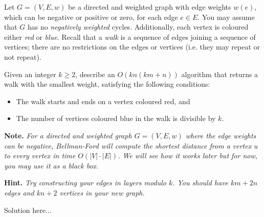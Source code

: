 \documentclass{article}
\begin{document}
\begin{question}
Let $G = (V, E, w)$ be a directed and weighted graph with edge weights $w(e)$, which can be negative or positive or zero, for each edge $e \in E$. You may assume that $G$ has no {\em negatively weighted} cycles. Additionally, each vertex is coloured either {\em red} or {\em blue}. Recall that a {\em walk} is a sequence of edges joining a sequence of vertices; there are no restrictions on the edges or vertices (i.e. they may repeat or not repeat).

Given an integer $k \geq 2$, describe an $O(kn(km + n))$ algorithm that returns a walk with the smallest weight, satisfying the following conditions:
\begin{itemize}
    \item The walk starts and ends on a vertex coloured red, and
    \item The number of vertices coloured blue in the walk is divisible by $k$.
\end{itemize}

{\bfseries Note.} {\em For a directed and weighted graph $G = (V, E, w)$ where the edge weights can be negative, Bellman-Ford will compute the shortest distance from a vertex $u$ to every vertex in time $O(\lvert V \rvert \cdot \lvert E \rvert)$. We will see how it works later but for now, you may use it as a black box.}

{\bfseries Hint.} {\em Try constructing your edges in layers modulo $k$. You should have $km + 2n$ edges and $kn + 2$ vertices in your new graph.}
\end{question}

\begin{solution}
Solution here...
\end{solution}
\end{document}
